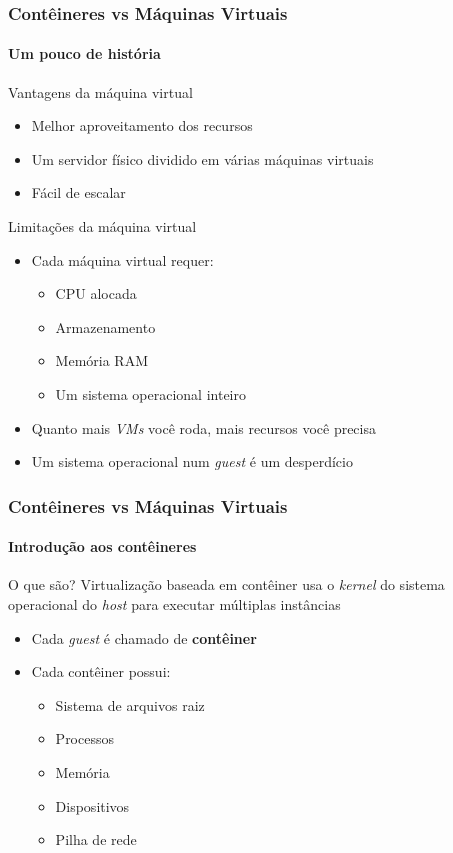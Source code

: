 \documentclass[12pt]{beamer}
\begin{document}
\begin{frame}
  \frametitle{Contêineres vs Máquinas Virtuais}
  \framesubtitle{Um pouco de história}
  \begin{block}{Vantagens da máquina virtual}
  \begin{itemize}
    \item Melhor aproveitamento dos recursos
    \item Um servidor físico dividido em várias máquinas virtuais
    \item Fácil de escalar
  \end{itemize}
  \end{block}
  \begin{block}{Limitações da máquina virtual}
    \begin{itemize}
      \item Cada máquina virtual requer:
        \begin{itemize}
        \item CPU alocada
        \item Armazenamento
        \item Memória RAM
        \item Um sistema operacional inteiro
      \end{itemize}
      \item Quanto mais \emph{VMs} você roda, mais recursos você precisa
      \item Um sistema operacional num \emph{guest} é um desperdício
    \end{itemize}
  \end{block}
\end{frame}
\begin{frame}
  \frametitle{Contêineres vs Máquinas Virtuais}
  \framesubtitle{Introdução aos contêineres}
  \begin{block}{O que são?}
          Virtualização baseada em contêiner usa o \emph{kernel} do sistema
          operacional do \emph{host} para executar múltiplas instâncias
  \end{block}
  \begin{block}{}
  \begin{itemize}
    \item Cada \emph{guest} é chamado de \textbf{contêiner}
    \item Cada contêiner possui:
      \begin{itemize}
        \item Sistema de arquivos raiz
        \item Processos
        \item Memória
        \item Dispositivos
        \item Pilha de rede
      \end{itemize}
  \end{itemize}
  \end{block}
\end{frame}
\end{document}
